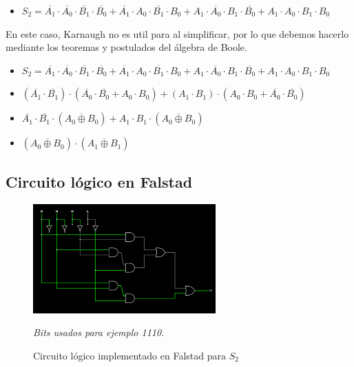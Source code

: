 \begin{itemize}
    \item $S_2 = \overline{A_1} \cdot \overline{A_0} \cdot \overline{B_1} \cdot \overline{B_0} + \overline{A_1} \cdot A_0 \cdot \overline{B_1} \cdot B_0 + A_1 \cdot \overline{A_0} \cdot B_1 \cdot \overline{B_0} + A_1 \cdot A_0 \cdot B_1 \cdot B_0$
\end{itemize}

En este caso, Karnaugh no es util para al simplificar, por lo que debemos hacerlo mediante los teoremas y postulados del álgebra de Boole.

\begin{itemize}
    \item $S_2 = \overline{A_1} \cdot \overline{A_0} \cdot \overline{B_1} \cdot \overline{B_0} + \overline{A_1} \cdot A_0 \cdot \overline{B_1} \cdot B_0 + A_1 \cdot \overline{A_0} \cdot B_1 \cdot \overline{B_0} + A_1 \cdot A_0 \cdot B_1 \cdot B_0$
    \item $(\overline{A_1} \cdot \overline{B_1}) \cdot (\overline{A_0} \cdot \overline{B_0} + A_0 \cdot B_0) + (A_1 \cdot B_1) \cdot (A_0 \cdot B_0 + \overline{A_0} \cdot \overline{B_0})$
    \item $ \overline{A_1} \cdot \overline{B_1} \cdot (\overline{A_0 \oplus B_0}) + A_1 \cdot B_1 \cdot (\overline{A_0 \oplus B_0})$
    \item $(\overline{A_0 \oplus B_0}) \cdot (\overline{A_1 \oplus B_1})$
\end{itemize}

\subsection{Circuito lógico en Falstad}

\begin{figure}[h!]
    \centering
    \includegraphics[width=7cm]{imagenes/2.2_S0.png}
    \caption{Circuito lógico implementado en Falstad para $S_2$}
    \label{fig:falstad_s2}
    \footnotesize\textit{Bits usados para ejemplo 1110.}
\end{figure}


